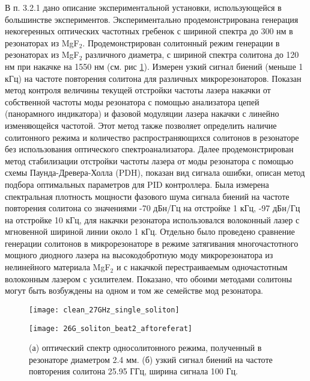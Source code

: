 В п. 3.2.1 дано описание экспериментальной установки, использующейся в большинстве экспериментов. Экспериментально продемонстрирована генерация некогеренных оптических частотных гребенок с шириной спектра до 300 нм в резонаторах из MgF$_2$. Продемонстрирован солитонный режим генерации в резонаторах из MgF$_2$ различного диаметра, с шириной спектра солитона до 120 нм при накачке на 1550 нм (см. рис \ref{clean_27GHz_single_soliton}). Измерен узкий сигнал биений (меньше 1 кГц) на частоте повторения солитона для различных микрорезонаторов. Показан метод контроля величины текущей отстройки частоты лазера накачки от собственной частоты моды резонатора с помощью анализатора цепей (панорамного индикатора) и фазовой модуляции лазера накачки с линейно изменяющейся частотой. Этот метод также позволяет определить наличие солитонного режима и количество распространяющихся солитонов в резонаторе без использования оптического спектроанализатора. Далее продемонстрирован метод стабилизации отстройки частоты лазера от моды резонатора с помощью схемы Паунда-Древера-Холла (PDH), показан вид сигнала ошибки, описан метод подбора оптимальных параметров для PID контроллера. Была измерена спектральная плотность мощности фазового шума сигнала биений на частоте повторения солитона со значениями -70 дБн/Гц на отстройке 1 кГц, -97 дБн/Гц на отстройке 10 кГц, для накачки резонатора использовался волоконный лазер с мгновенной шириной линии около 1 кГц. Отдельно было проведено сравнение генерации солитонов в микрорезонаторе в режиме затягивания многочастотного мощного диодного лазера на высокодобротную моду микрорезонатора из нелинейного материала MgF$_2$ и с накачкой перестраиваемым одночастотным волоконным лазером с усилителем. Показано, что обоими методами солитоны могут быть возбуждены на одном и том же семействе мод резонатора.

\begin{figure}[!htb]
  \begin{minipage}{0.49\linewidth}\centering
    \texttt{[image: clean\_27GHz\_single\_soliton]}
  \end{minipage}
  \hfill
  \begin{minipage}{0.49\linewidth}\centering
    \texttt{[image: 26G\_soliton\_beat2\_aftoreferat]}
  \end{minipage}
  \setlength{\belowcaptionskip}{1pt}
  \caption{(а) оптический спектр односолитонного режима, полученный в резонаторе диаметром 2.4 мм. (б) узкий сигнал биений на частоте повторения солитона 25.95 ГГц, ширина сигнала 100 Гц.}
  \label{clean_27GHz_single_soliton}
\end{figure}

